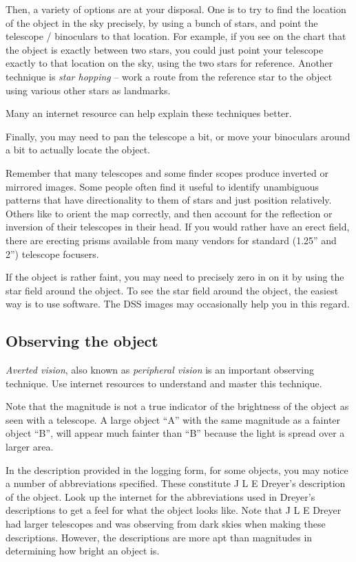 Then, a variety of options are at your disposal. One is to try to find
the location of the object in the sky precisely, by using a bunch of
stars, and point the telescope / binoculars to that location. For
example, if you see on the chart that the object is exactly between
two stars, you could just point your telescope exactly to that
location on the sky, using the two stars for reference. Another
technique is \emph{star hopping} -- work a route from the reference
star to the object using various other stars as landmarks.

Many an internet resource can help explain these techniques better.

Finally, you may need to pan the telescope a bit, or move your
binoculars around a bit to actually locate the object.

Remember that many telescopes and some finder scopes produce inverted
or mirrored images. Some people often find it useful to identify
unambiguous patterns that have directionality to them of stars and
just position relatively. Others like to orient the map correctly, and
then account for the reflection or inversion of their telescopes in
their head. If you would rather have an erect field, there are
erecting prisms available from many vendors for standard (1.25'' and
2'') telescope focusers.

If the object is rather faint, you may need to precisely zero in on it
by using the star field around the object. To see the star field
around the object, the easiest way is to use software. The DSS images
may occasionally help you in this regard.

\subsection{Observing the object}

\emph{Averted vision}, also known as \emph{peripheral vision} is an
important observing technique. Use internet resources to understand
and master this technique.

Note that the magnitude is not a true indicator of the brightness of
the object as seen with a telescope. A large object ``A'' with the
same magnitude as a fainter object ``B'', will appear much fainter
than ``B'' because the light is spread over a larger area.

In the description provided in the logging form, for some objects, you
may notice a number of abbreviations specified. These constitute J L E
Dreyer's description of the object. Look up the internet for the
abbreviations used in Dreyer's descriptions to get a feel for what the
object looks like. Note that J L E Dreyer had larger telescopes and
was observing from dark skies when making these descriptions. However,
the descriptions are more apt than magnitudes in determining how
bright an object is.

